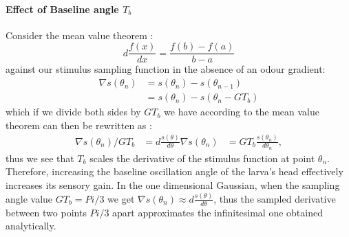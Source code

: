 \documentclass[10pt,a4paper]{article}
\begin{document}
\paragraph{Effect of Baseline angle $T_b$}
Consider the mean value theorem :
\begin{equation}
d\frac{f(x)}{dx} = \frac{f(b) - f(a)}{b-a}
\end{equation}
against our stimulus sampling function in the absence of an odour gradient:
\begin{align}
\nabla s(\theta_n) &= s(\theta_n) - s(\theta_{n-1})\\
				   &= s(\theta_n) - s(\theta_{n} - G T_b)
\end{align}
which if we divide both sides by $G T_b$ we have  according to the mean value theorem can then be rewritten as :
\begin{align}
\nabla s(\theta_n)/G T_b &= d\frac{s(\theta)}{d\theta}
 \nabla s(\theta_n) &= G T_b \frac{s(\theta_n)}{d\theta_n},
\end{align}
thus we see that $T_b$ scales the derivative of the stimulus function at point $\theta_n$. Therefore, increasing the baseline oscillation angle of the larva's head effectively increases its sensory gain.
In the one dimensional Gaussian, when the sampling angle value $G T_b = Pi/3$ we get $\nabla s(\theta_n) \approx d\frac{s(\theta)}{d\theta}$, thus the sampled derivative between two points $Pi/3$ apart approximates the infinitesimal one obtained analytically.
\end{document}
